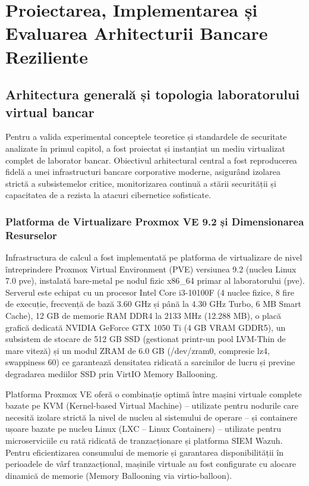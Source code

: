 \chapter{Proiectarea, Implementarea și Evaluarea Arhitecturii Bancare Reziliente}

\section{Arhitectura generală și topologia laboratorului virtual bancar}

Pentru a valida experimental conceptele teoretice și standardele de securitate analizate în primul capitol, a fost proiectat și instanțiat un mediu virtualizat complet de laborator bancar. Obiectivul arhitectural central a fost reproducerea fidelă a unei infrastructuri bancare corporative moderne, asigurând izolarea strictă a subsistemelor critice, monitorizarea continuă a stării securității și capacitatea de a rezista la atacuri cibernetice sofisticate.

\subsection{Platforma de Virtualizare Proxmox VE 9.2 și Dimensionarea Resurselor}

Infrastructura de calcul a fost implementată pe platforma de virtualizare de nivel întreprindere Proxmox Virtual Environment (PVE) versiunea 9.2 (nucleu Linux 7.0 pve), instalată bare-metal pe nodul fizic x86\_64 primar al laboratorului (pve). Serverul este echipat cu un procesor Intel Core i3-10100F (4 nuclee fizice, 8 fire de execuție, frecvență de bază 3.60 GHz și până la 4.30 GHz Turbo, 6 MB Smart Cache), 12 GB de memorie RAM DDR4 la 2133 MHz (12.288 MB), o placă grafică dedicată NVIDIA GeForce GTX 1050 Ti (4 GB VRAM GDDR5), un subsistem de stocare de 512 GB SSD (gestionat printr-un pool LVM-Thin de mare viteză) și un modul ZRAM de 6.0 GB (/dev/zram0, compresie lz4, swappiness 60) ce garantează densitatea ridicată a sarcinilor de lucru și previne degradarea mediilor SSD prin VirtIO Memory Ballooning.

Platforma Proxmox VE oferă o combinație optimă între mașini virtuale complete bazate pe KVM (Kernel-based Virtual Machine) – utilizate pentru nodurile care necesită izolare strictă la nivel de nucleu al sistemului de operare – și containere ușoare bazate pe nucleu Linux (LXC – Linux Containers) – utilizate pentru microserviciile cu rată ridicată de tranzacționare și platforma SIEM Wazuh. Pentru eficientizarea consumului de memorie și garantarea disponibilității în perioadele de vârf tranzacțional, mașinile virtuale au fost configurate cu alocare dinamică de memorie (Memory Ballooning via virtio-balloon).

